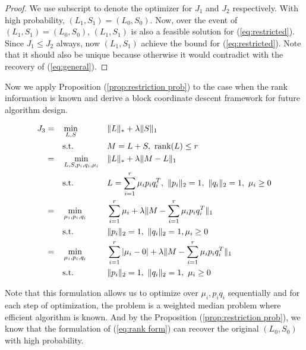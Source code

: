 \begin{proof}
We use subscript to denote the optimizer for $J_{1}$ and $J_{2}$ respectively.
With high probability, $(L_{1},S_{1})=(L_{0},S_{0})$. Now, over the event of $(L_{1},S_{1})=(L_{0},S_{0})$, $(L_{1},S_{1})$ is also a feasible solution for (\ref{eq:restricted}). Since $J_{1}\le J_{2}$ always, now $(L_{1},S_{1})$ achieve the bound for (\ref{eq:restricted}).
Note that it should also be unique because otherwise it would contradict with the recovery of (\ref{eq:general}).
\end{proof}

Now we apply Proposition (\ref{prop:restriction prob}) to the case when the rank information is known and derive a block coordinate descent framework for future algorithm design.

\begin{alignat}{3}
J_{3} 
&= &&\min_{L, S}  && \|L\|_{*} + \lambda \|S\|_{1} \notag \\
&&&\text{s.t.} && M=L+S, \ \text{rank}(L)\le r \notag \\
&= &&\min_{L, S, p_i, q_i, \mu_i} && \|L\|_{*} + \lambda\| M - L \|_{1} \notag \\
&&& \text{s.t.} && L = \sum_{i=1}^{r} \mu_{i}p_{i}q_{i}^{T}, \  \|p_{i}\|_{2}=1, \ \|q_{i}\|_{2}=1, \ \mu_{i}\ge0 \notag \\
&= && \min_{\mu_{i}, p_{i}, q_{i}} && \sum_{i=1}^{r} \mu_{i} + \lambda \|M - \sum_{i=1}^{r} \mu_{i}p_{i}q_{i}^{T}\|_{1} \notag \\
&&& \text{s.t.} && \|p_{i}\|_{2} = 1, \ \|q_{i}\|_{2} = 1, \mu_{i} \ge 0 \notag \\
& = && \min_{\mu_{i}, p_{i}, q_{i}} && \sum_{i=1}^{r} |\mu_{i}-0| + \lambda \|M - \sum_{i=1}^{r} \mu_{i} p_{i} q_{i}^{T}\|_{1} \label{eq:rank form} \\
&&& \text{s.t.} && \|p_{i}\|_{2} = 1, \ \|q_{i}\|_{2} = 1, \ \mu_{i} \ge 0 \notag
\end{alignat}

Note that this formulation allows us to optimize over $\mu_{i},p_{i}q_{i}$ sequentially and for each step of optimization, the problem is a weighted median problem where efficient algorithm is known. And by the Proposition (\ref{prop:restriction prob}), we know that the formulation of (\ref{eq:rank form}) can recover the original $(L_{0},S_{0})$ with high probability.


